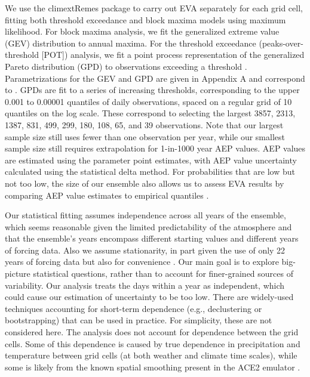 \documentclass{ametsocV6.1}
\begin{document}
We use the climextRemes package \citep{climextRemes} to carry out EVA separately for each grid cell, fitting both threshold exceedance and block maxima models using maximum likelihood. 
For block maxima analysis, we fit the generalized extreme value (GEV) distribution to annual maxima.
For the threshold exceedance (peaks-over-threshold [POT]) analysis, we fit a point process representation of the generalized Pareto distribution (GPD) to observations exceeding a threshold \citep[Section 7]{smith1989extreme,coles2001introduction}.
Parametrizations for the GEV and GPD are given in Appendix A and correspond to \cite{coles2001introduction}.
GPDs are fit to a series of increasing thresholds, corresponding to the upper 0.001 to 0.00001 quantiles of daily observations, spaced on a regular grid of 10 quantiles on the log scale. 
These correspond to selecting the largest 3857, 2313, 1387, 831, 499, 299, 180, 108, 65, and 39 observations. 
Note that our largest sample size still uses fewer than one observation per year, while our smallest sample size still requires extrapolation for 
1-in-1000 year AEP values.
AEP values are estimated using the parameter point estimates, with AEP value uncertainty calculated using the statistical delta method. 
For probabilities that are low but not too low, the size of our ensemble also allows us to assess EVA results by comparing AEP value estimates to empirical quantiles \citep[e.g.,][]{huang2016estimating}.


Our statistical fitting assumes independence across all years of the ensemble, which seems reasonable given the limited predictability of the atmosphere and that the ensemble's years encompass different starting values and different years of forcing data. 
Also we assume stationarity, in part given the use of only 22 years of forcing data but also for convenience \citep[see also][]{ben2020evaluation}. 
Our main goal is to explore big-picture statistical questions, rather than to account for finer-grained sources of variability. 
Our analysis treats the days within a year as independent, which could cause our estimation of uncertainty to be too low. 
There are widely-used techniques accounting for short-term dependence 
(e.g., declustering or bootstrapping) that can be used in practice. 
For simplicity, these are not considered here.
The analysis does not account for dependence between the grid cells. %
Some of this dependence is caused by true dependence in precipitation and temperature between grid cells (at both weather and climate time scales), while some is likely from the known spatial smoothing present in the ACE2 emulator \citep{watt2025ace2}.
\end{document}
